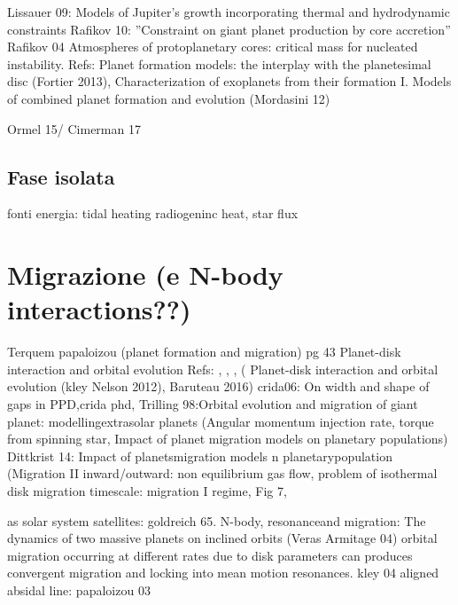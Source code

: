 \begin{workout}
\begin{workout}
Lissauer 09: Models of Jupiter’s growth incorporating thermal and hydrodynamic constraints
Rafikov 10: ''Constraint on giant planet production by core accretion''
Rafikov 04 Atmospheres of protoplanetary cores: critical mass for nucleated instability.
Refs: Planet formation models: the interplay with the planetesimal disc (Fortier 2013), Characterization of exoplanets from their formation I. Models of combined planet formation and evolution (Mordasini 12)
\end{workout}

\begin{workout}
Ormel 15/ Cimerman 17
\end{workout}

\section{Fase isolata}

fonti energia: tidal heating radiogeninc heat, star flux

{\let\clearpage\relax\let\cleardoublepage\relax
\chapter{Migrazione (e N-body interactions??)}
}

\begin{workout}
Terquem papaloizou (planet formation and migration) pg 43
Planet-disk interaction and orbital evolution
Refs: \cite{ward1997protoplanet}, \cite{terquem2000disks}, \cite{menou2004low}, (
Planet-disk interaction and orbital evolution (kley Nelson 2012), 
Baruteau 2016)
crida06: On width and shape of gaps in PPD,crida phd, 
Trilling 98:Orbital evolution and migration of giant planet: modellingextrasolar planets (Angular momentum injection rate, torque from spinning star, Impact of planet migration models on planetary populations)
Dittkrist 14: Impact of planetsmigration models n planetarypopulation (Migration II inward/outward: non equilibrium gas flow, problem of isothermal disk migration timescale: migration I regime, Fig 7,
\end{workout}

\begin{workout}
as solar system satellites: goldreich 65.
N-body, resonanceand migration: The dynamics of two massive planets on inclined orbits (Veras Armitage 04)
orbital migration occurring at different rates due to disk parameters can produces convergent migration and locking into mean motion resonances.
kley 04
aligned absidal line: papaloizou 03
\end{workout}


\end{workout}
